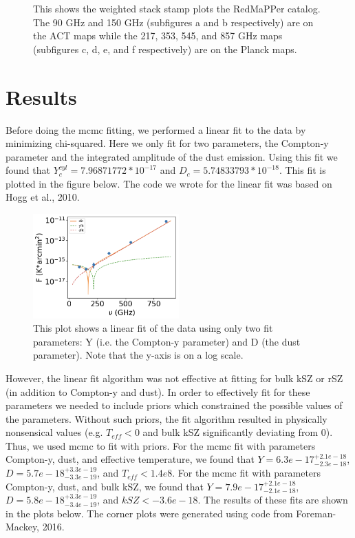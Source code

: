 \documentclass{princeton_astro_thesis}
\begin{document}
\begin{figure}[ht]
\begin{subfigure}[b]{0.1\linewidth}
    \caption{\label{fig:fig3}}
  \end{subfigure}
  \caption{This shows the weighted stack stamp plots the RedMaPPer catalog. The 90 GHz and 150 GHz (subfigures a and b respectively) are on the ACT maps while the 217, 353, 545, and 857 GHz maps (subfigures c, d, e, and f respectively) are on the Planck maps. }
\end{figure}
\chapter{Results}
Before doing the mcmc fitting, we performed a linear fit to the data by minimizing chi-squared. Here we only fit for two parameters, the Compton-y parameter and the integrated amplitude of the dust emission. Using this fit we found that $Y^{cyl}_{c}=7.96871772*10^{-17}$ and $D_c=5.74833793*10^{-18}$. This fit is plotted in the figure below. The code we wrote for the linear fit was based on Hogg et al., 2010.

\begin{figure}[h]
\centering
\includegraphics[width=0.5\textwidth]{../redmapper_apfluxes_fitlog_earlier_version.png}
\caption{This plot shows a linear fit of the data using only two fit parameters: Y (i.e. the Compton-y parameter) and D (the dust parameter). Note that the y-axis is on a log scale.}
\end{figure}

\par However, the linear fit algorithm was not effective at fitting for bulk kSZ or rSZ (in addition to Compton-y and dust). In order to effectively fit for these parameters we needed to include priors which constrained the possible values of the parameters. Without such priors, the fit algorithm resulted in physically nonsensical values (e.g. $T_{eff}<0$ and bulk kSZ significantly deviating from 0). Thus, we used mcmc to fit with priors. For the mcmc fit with parameters Compton-y, dust, and effective temperature, we found that $Y=6.3e-17^{+2.1e-18}_{-2.3e-18}$, $D=5.7e-18^{+3.3e-19}_{-3.3e-19}$, and $T_{eff}<1.4e8$. For the mcmc fit with parameters Compton-y, dust, and bulk kSZ, we found that $Y=7.9e-17^{+2.1e-18}_{-2.1e-18}$, $D=5.8e-18^{+3.3e-19}_{-3.4e-19}$, and $kSZ<-3.6e-18$. The results of these fits are shown in the plots below. The corner plots were generated using code from Foreman-Mackey, 2016. 
\end{document}
